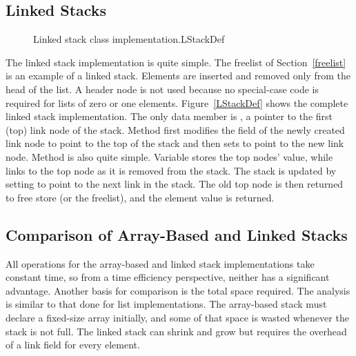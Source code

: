\newpage

\subsection{Linked Stacks}

\begin{figure}
\vspace{-\bigskipamount}

{Linked stack class implementation.}{LStackDef}
\end{figure}

The linked stack implementation is quite simple.
The freelist of Section~\ref{freelist} is an example
of a linked stack.
Elements are inserted and removed only from the head of the list.
A header node is not used because no special-case code is required
for lists of zero or one elements.
Figure~\ref{LStackDef} shows the complete linked stack
implementation.
The only data member is , a pointer to the
first (top) link node of the stack.
Method  first modifies the 
field of the newly created link node to point to the top of the
stack and then sets  to point to the new
link node.
Method  is also quite simple.
Variable  stores the top nodes' value,
while  links to the top node as it is removed from
the stack.
The stack is updated by setting  to point to the
next link in the stack.
The old top node is then returned to free store (or the freelist), and
the element value is returned.

\subsection{Comparison of Array-Based and Linked Stacks}

All operations for the array-based and linked stack implementations
take constant time, so from a time efficiency perspective, neither has
a significant advantage.
Another basis for comparison is the total space
required.
The analysis is similar to that done for list implementations.
The array-based stack must declare a fixed-size array initially, and
some of that space is wasted whenever the stack is not full.
The linked stack can shrink and grow but requires the overhead of a
link field for every element.

